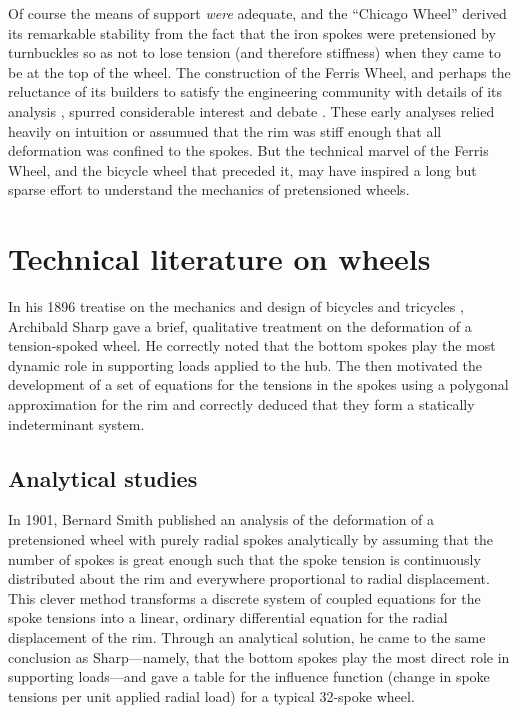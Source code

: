 \documentclass[../thesis.tex]{subfiles}
\begin{document}
Of course the means of support \emph{were} adequate, and the ``Chicago Wheel'' derived its remarkable stability from the fact that the iron spokes were pretensioned by turnbuckles so as not to lose tension (and therefore stiffness) when they came to be at the top of the wheel. The construction of the Ferris Wheel, and perhaps the reluctance of its builders to satisfy the engineering community with details of its analysis , spurred considerable interest and debate \cite{Searles1893}. These early analyses relied heavily on intuition or assumued that the rim was stiff enough that all deformation was confined to the spokes. But the technical marvel of the Ferris Wheel, and the bicycle wheel that preceded it, may have inspired a long but sparse effort to understand the mechanics of pretensioned wheels.


\section{Technical literature on wheels}


In his 1896 treatise on the mechanics and design of bicycles and tricycles \cite{Sharp}, Archibald Sharp gave a brief, qualitative treatment on the deformation of a tension-spoked wheel. He correctly noted that the bottom spokes play the most dynamic role in supporting loads applied to the hub. The then motivated the development of a set of equations for the tensions in the spokes using a polygonal approximation for the rim and correctly deduced that they form a statically indeterminant system.

\subsection{Analytical studies}

In 1901, Bernard Smith \cite{Smith} published an analysis of the deformation of a pretensioned wheel with purely radial spokes analytically by assuming that the number of spokes is great enough such that the spoke tension is continuously distributed about the rim and everywhere proportional to radial displacement. This clever method transforms a discrete system of coupled equations for the spoke tensions into a linear, ordinary differential equation for the radial displacement of the rim. Through an analytical solution, he came to the same conclusion as Sharp---namely, that the bottom spokes play the most direct role in supporting loads---and gave a table for the influence function (change in spoke tensions per unit applied radial load) for a typical 32-spoke wheel.
\end{document}
